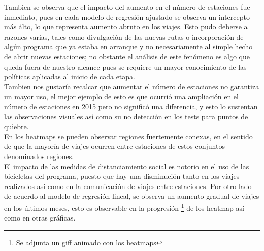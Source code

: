 \documentclass[
]{article}
\begin{document}
  Tambien se observa que el impacto del aumento en el número de estaciones fue inmediato, pues en cada modelo de regresión ajustado se observa un intercepto más álto, lo que representa aumento abruto en los viajes. Esto pudo deberse a razones varias, tales como divulgación de las nuevas rutas o incorporación de algún programa que ya estaba en arranque y no necesariamente al simple hecho de abrir nuevas estaciones; no obstante el análisis de este fenómeno es algo que queda fuera de nuestro alcance pues se requiere un mayor conocimiento de las políticas aplicadas al inicio de cada etapa.\\

  Tambien nos gustaría recalcar que aumentar el número de estaciones no
  garantiza un mayor uso, el mejor ejemplo de esto es que ocurrió una ampliación en el número de estaciones en 2015 pero no
  significó una diferencia, y esto lo sustentan las observaciones
  visuales así como su no detección en los tests para puntos de quiebre.\\

  En los heatmaps se pueden observar regiones fuertemente conexas, en el sentido de que la mayoría de viajes ocurren entre estaciones de estos conjuntos denominados regiones.\\

  El impacto de las medidas de distanciamiento social es notorio en el
  uso de las bicicletas del programa, puesto que hay una disminución tanto en los viajes realizados así como en la comunicación de viajes entre estaciones. Por otro lado de acuerdo al modelo de regresión lineal, se observa un aumento gradual de viajes en los últimos meses, esto es observable en la progresión \footnote{Se adjunta un giff animado con los heatmaps} de los heatmap así como en otras gráficas.
\end{document}
